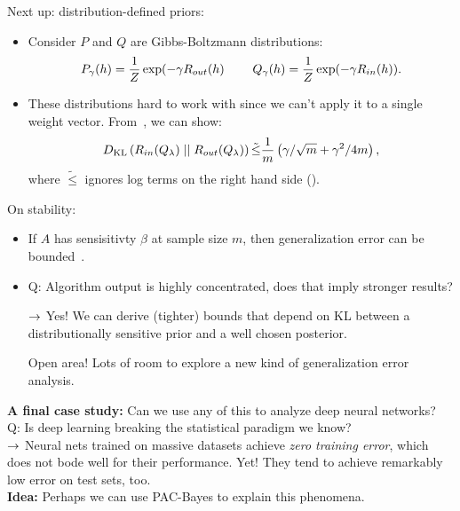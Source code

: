 Next up: distribution-defined priors:
\begin{itemize}
    \item Consider $P$ and $Q$ are Gibbs-Boltzmann distributions:
    \[
    P_\gamma(h) = \frac{1}{Z} \exp(-\gamma R_{out}(h) \hspace{8mm} Q_\gamma(h) = \frac{1}{Z}\exp(-\gamma R_{in}(h)).
    \]
    \item These distributions hard to work with since we can't apply it to a single weight vector. From~\citet{catoni2007pac}, we can show:
    \[
    D_{\text{KL}}\left(R_{in}(Q_\lambda) \mid \mid R_{out}(Q_\lambda)\right) \tilde{\leq} \frac{1}{m} \left(\gamma / \sqrt{m} + \gamma^2/4m\right),
    \]
    where $\tilde{\leq}$ ignores log terms on the right hand side ().
    
\end{itemize}

On stability:
\begin{itemize}
    \item If $A$ has sensisitivty $\beta$ at sample size $m$, then generalization error can be bounded~\cite{bousquet2002stability}.
    
    \item Q: Algorithm output is highly concentrated, does that imply stronger results?
    
    $\rightarrow$ Yes! We can derive (tighter) bounds that depend on KL between a distributionally sensitive prior and a well chosen posterior.
    
    Open area! Lots of room to explore a new kind of generalization error analysis.
\end{itemize}

{\bf A final case study:} Can we use any of this to analyze deep neural networks? \\

Q: Is deep learning breaking the statistical paradigm we know? \\

$\rightarrow$ Neural nets trained on massive datasets achieve {\it zero training error}, which does not bode well for their performance. Yet! They tend to achieve remarkably low error on test sets, too. \\

{\bf Idea:} Perhaps we can use PAC-Bayes to explain this phenomena. \\



